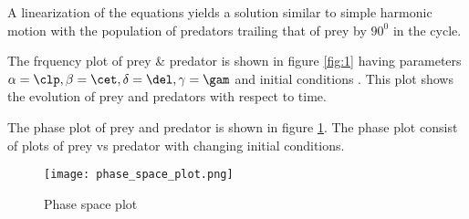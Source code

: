 \documentclass{article}
\begin{document}
A linearization of the equations yields a solution similar to simple harmonic motion with the population of predators trailing that of prey by $90^0$ in the cycle.

The frquency plot of prey \& predator is shown in figure \ref{fig:1} having parameters $\alpha = \clp, \beta = \cet, \delta = \del, \gamma = \gam$ and initial conditions \init. This plot shows the evolution of prey and predators with respect to time.


The phase plot of prey and predator is shown in figure \ref{fig:2}. The phase plot consist of plots of prey vs predator with changing initial conditions. 


\begin{figure}[h]
\begin{center}
\texttt{[image: phase\_space\_plot.png]}
\caption{Phase space plot}\label{fig:2}
\end{center}
\end{figure}

\newpage


\end{document}
